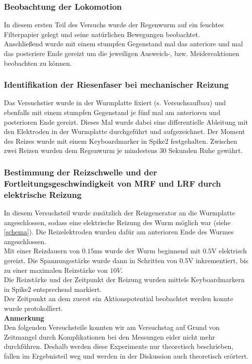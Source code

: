 \documentclass[11pt]{article}
\begin{document}
\subsubsection{Beobachtung der Lokomotion}
In diesem ersten Teil des Versuchs wurde der Regenwurm auf ein feuchtes Filterpapier gelegt und seine natürlichen Bewegungen beobachtet.\\
Anschließend wurde mit einem stumpfen Gegenstand mal das anteriore und mal das posteriere Ende gereizt um die jeweiligen Ausweich-, bzw. Meidereaktionen beobachten zu können. 

\subsubsection{Identifikation der Riesenfaser bei mechanischer Reizung}
Das Versuchstier wurde in der Wurmplatte fixiert (s. Versuchsaufbau) und ebenfalls mit einem stumpfen Gegenstand je fünf mal am anterioren und posterioren Ende gereizt. Dieses Mal wurde dabei eine differentielle Ableitung mit den Elektroden in der Wurmplatte durchgeführt und aufgezeichnet. Der Moment des Reizes wurde mit einem Keyboardmarker in Spike2 festgehalten. Zwischen zwei Reizen wurden dem Regenwurm je mindestens 30 Sekunden Ruhe gewährt.

\subsubsection{Bestimmung der Reizschwelle und der Fortleitungsgeschwindigkeit von MRF und LRF durch elektrische Reizung}
In diesem Versuchsteil wurde zusätzlich der Reizgenerator an die Wurmplatte angeschlossen, sodass eine elektrische Reizung des Wurm möglich war (siehe \ref{schema}). Die Reizelektroden wurden dafür am anterioren Ende des Wurmes angeschlossen. \\
Mit einer Reizdauern von $0.15$ms wurde der Wurm beginnend mit $0.5$V elektrisch gereizt.  Die Spannungsstärke wurde dann in Schritten von $0.5$V inkrementiert, bis zu einer maximalen Reizstärke von $10V$. \\
Die Reizstärke und der Zeitpunkt der Reizung wurden mittels Keyboardmarkern in Spike2 entsprechend markiert. \\
Der Zeitpunkt an dem zuerst ein Aktionspotential beobachtet werden konnte wurde protokolliert. \\



\textbf{Anmerkung}\\
Den folgenden Versuchsteile konnten wir am Versuchstag auf Grund von Zeitmangel durch Komplikationen bei den Messungen eider nicht mehr durchführen. Deshalb werden diese Experimente nur theoretisch beschrieben, fallen im Ergebnisteil weg und werden in der Diskussion auch theoretisch erörtert. 
\end{document}
